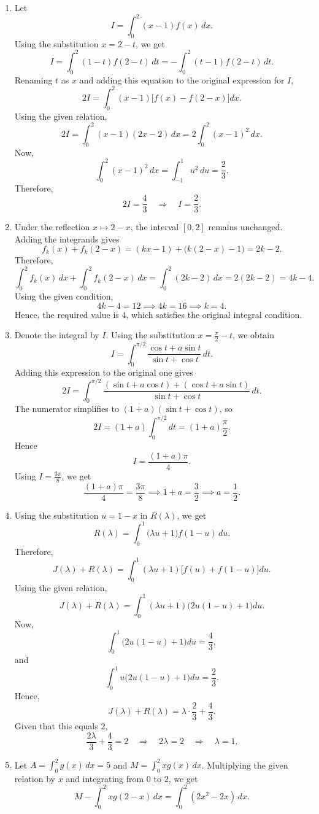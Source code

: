 \documentclass[11pt,a4paper]{article}
\begin{document}
\begin{enumerate}
\[\]
Thus the integrand is odd with respect to \(x\), while the domain is symmetric under \(x\mapsto -x\). Contributions from corresponding points cancel pairwise. Therefore,
\[
J=0.
\]
\item Let
\[
I=\int_0^2 (x-1)f(x)\,dx.
\]
Using the substitution $x=2-t$, we get
\[
I=\int_0^2 (1-t)f(2-t)\,dt=-\int_0^2 (t-1)f(2-t)\,dt.
\]
Renaming $t$ as $x$ and adding this equation to the original expression for $I$,
\[
2I=\int_0^2 (x-1)\bigl[f(x)-f(2-x)\bigr]dx.
\]
Using the given relation,
\[
2I=\int_0^2 (x-1)(2x-2)\,dx=2\int_0^2 (x-1)^2\,dx.
\]
Now,
\[
\int_0^2 (x-1)^2\,dx=\int_{-1}^{1}u^2\,du=\frac{2}{3}.
\]
Therefore,
\[
2I=\frac{4}{3}\quad\Longrightarrow\quad I=\frac{2}{3}.
\]
\item Under the reflection $x\mapsto 2-x$, the interval $[0,2]$ remains unchanged. Adding the integrands gives
$$f_k(x)+f_k(2-x)=(kx-1)+\bigl(k(2-x)-1\bigr)=2k-2.$$
Therefore,
$$\int_0^2 f_k(x)\,dx+\int_0^2 f_k(2-x)\,dx=\int_0^2(2k-2)\,dx=2(2k-2)=4k-4.$$
Using the given condition,
$$4k-4=12\implies 4k=16\implies k=4.$$
Hence, the required value is $\boxed{4}$, which satisfies the original integral condition.
\item Denote the integral by $I$. Using the substitution $x=\frac{\pi}{2}-t$, we obtain
$$I=\int_{0}^{\pi/2}\frac{\cos t+a\sin t}{\sin t+\cos t}\,dt.$$
Adding this expression to the original one gives
$$2I=\int_{0}^{\pi/2}\frac{(\sin t+a\cos t)+(\cos t+a\sin t)}{\sin t+\cos t}\,dt.$$
The numerator simplifies to $(1+a)(\sin t+\cos t)$, so
$$2I=(1+a)\int_{0}^{\pi/2}dt=(1+a)\frac{\pi}{2}.$$
Hence
$$I=\frac{(1+a)\pi}{4}.$$
Using $I=\frac{3\pi}{8}$, we get
$$\frac{(1+a)\pi}{4}=\frac{3\pi}{8}\implies 1+a=\frac{3}{2}\implies a=\frac{1}{2}.$$
\item Using the substitution $u=1-x$ in $R(\lambda)$, we get
\[
R(\lambda)=\int_0^1\bigl(\lambda u+1\bigr)f(1-u)\,du.
\]
Therefore,
\[
J(\lambda)+R(\lambda)
=\int_0^1(\lambda u+1)\bigl[f(u)+f(1-u)\bigr]du.
\]
Using the given relation,
\[
J(\lambda)+R(\lambda)=\int_0^1(\lambda u+1)\bigl(2u(1-u)+1\bigr)du.
\]
Now,
\[
\int_0^1\bigl(2u(1-u)+1\bigr)du=\frac43,
\]
and
\[
\int_0^1u\bigl(2u(1-u)+1\bigr)du=\frac23.
\]
Hence,
\[
J(\lambda)+R(\lambda)=\lambda\cdot\frac23+\frac43.
\]
Given that this equals $2$,
\[
\frac{2\lambda}{3}+\frac43=2
\quad\Longrightarrow\quad
2\lambda=2
\quad\Longrightarrow\quad
\lambda=1.
\]
\item Let $A=\int_0^2 g(x)\,dx=5$ and $M=\int_0^2 xg(x)\,dx$. Multiplying the given relation by $x$ and integrating from $0$ to $2$, we get
\[
M-\int_0^2 xg(2-x)\,dx=\int_0^2(2x^2-2x)\,dx.
\]
\end{enumerate}
\end{document}
